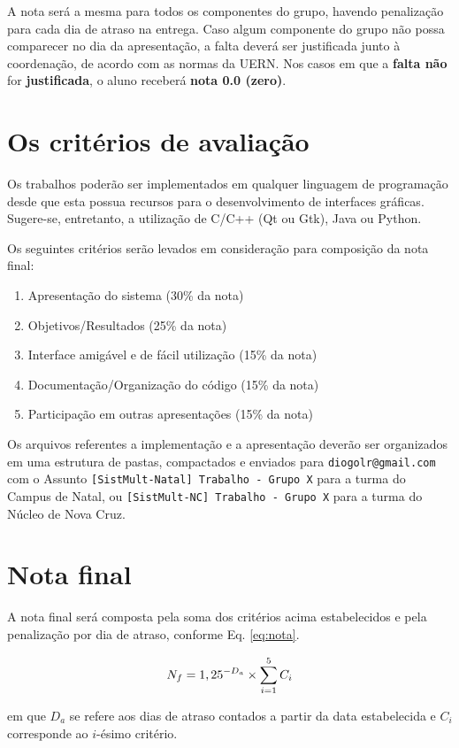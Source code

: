 \documentclass[a4paper,11pt]{article}
\begin{document}
A nota será a mesma para todos os componentes do grupo, havendo penalização para
cada dia de atraso na entrega. Caso algum componente do grupo não possa
comparecer no dia da apresentação, a falta deverá ser justificada junto à
coordenação, de acordo com as normas da UERN. Nos casos em que a {\bf falta não}
for {\bf justificada}, o aluno receberá {\bf nota 0.0 (zero)}.

\section*{Os critérios de avaliação}
Os trabalhos poderão ser implementados em qualquer linguagem de programação
desde que esta possua recursos para o desenvolvimento de interfaces gráficas.
Sugere-se, entretanto, a utilização de C/C++ (Qt ou Gtk), Java ou Python. 

Os seguintes critérios serão levados em consideração para composição da nota
final:

\begin{enumerate}
    \item Apresentação do sistema (30\% da nota)
    \item Objetivos/Resultados (25\% da nota)
    \item Interface amigável e de fácil utilização (15\% da nota)
    \item Documentação/Organização do código (15\% da nota)
    \item Participação em outras apresentações (15\% da nota)
\end{enumerate}

Os arquivos referentes a implementação e a apresentação deverão ser organizados
em uma estrutura de pastas, compactados e enviados para {\tt diogolr@gmail.com}
com o Assunto {\tt [SistMult-Natal] Trabalho - Grupo X} para a turma do Campus
de Natal, ou {\tt [SistMult-NC] Trabalho - Grupo X} para a turma do Núcleo de
Nova Cruz.

\section*{Nota final}
A nota final será composta pela soma dos critérios acima estabelecidos e pela
penalização por dia de atraso, conforme Eq. \ref{eq:nota}.

\begin{equation}\label{eq:nota}
N_f = \displaystyle 1,25^{-D_a} \times \sum_{i = 1}^5 C_i
\end{equation}

\noindent em que $D_a$ se refere aos dias de atraso contados a partir da data
estabelecida e $C_i$ corresponde ao $i$-ésimo critério.
\end{document}
